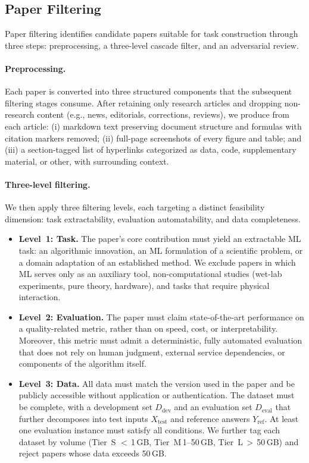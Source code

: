 \documentclass{llmxive}
\begin{document}
\subsection{Paper Filtering}
\label{sec:gym:filter}


Paper filtering identifies candidate papers suitable for task construction through three steps: preprocessing, a three-level cascade filter, and an adversarial review.

\paragraph{Preprocessing.}

Each paper is converted into three structured components that the subsequent filtering stages consume.
After retaining only research articles and dropping non-research content (e.g., news, editorials, corrections, reviews), we produce from each article: (i) markdown text preserving document structure and formulas with citation markers removed;
(ii) full-page screenshots of every figure and table;
and (iii) a section-tagged list of hyperlinks categorized as data, code, supplementary material, or other, with surrounding context.


\paragraph{Three-level filtering.}
We then apply three filtering levels, each targeting a distinct feasibility dimension: task extractability, evaluation automatability, and data completeness.

\begin{itemize}[topsep=0pt, partopsep=0pt, leftmargin=12pt, itemsep=5pt]
\item \textbf{Level~1: Task.} The paper's core contribution must yield an extractable ML task: an algorithmic innovation, an ML formulation of a scientific problem, or a domain adaptation of an established method. We exclude papers in which ML serves only as an auxiliary tool, non-computational studies (wet-lab experiments, pure theory, hardware), and tasks that require physical interaction.

\item \textbf{Level~2: Evaluation.} The paper must claim state-of-the-art performance on a quality-related metric, rather than on speed, cost, or interpretability. Moreover, this metric must admit a deterministic, fully automated evaluation that does not rely on human judgment, external service dependencies, or components of the algorithm itself.

\item \textbf{Level~3: Data.} All data must match the version used in the paper and be publicly accessible without application or authentication. The dataset must be complete, with a development set $D_\text{dev}$ and an evaluation set $D_\text{eval}$ that further decomposes into test inputs $X_\text{test}$ and reference answers $Y_\text{ref}$. At least one evaluation instance must satisfy all conditions. We further tag each dataset by volume (Tier~S $<$\,1\,GB, Tier~M\,1--50\,GB, Tier~L\,$>$\,50\,GB) and reject papers whose data exceeds 50\,GB.
\end{itemize}
\end{document}
